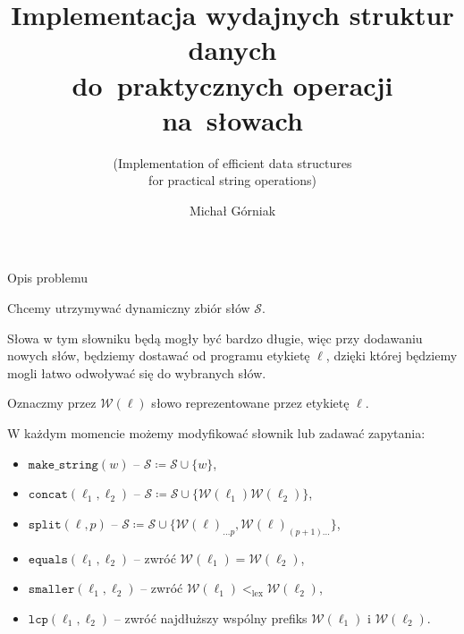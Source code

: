 \documentclass[polish]{beamer}
\title[Obrona pracy licencjackiej]{Implementacja wydajnych struktur danych\\ do~praktycznych operacji na~słowach}
\subtitle{(Implementation of efficient data structures\\ for practical string operations)}
\author{Michał Górniak}
\institute[II UWr]{Instytut Informatyki Uniwersytetu Wrocławskiego}
\date{\displaydate{date}}
\begin{document}
\begin{frame}
    \titlepage
\end{frame}

\begin{frame}{Opis problemu}
    \begin{alertblock}{}
        Chcemy utrzymywać dynamiczny zbiór słów $\mathcal{S}$.
    \end{alertblock}
    \pause
    \begin{block}{}
        Słowa w tym słowniku będą mogły być bardzo długie, więc przy dodawaniu nowych słów, będziemy dostawać od programu etykietę $\ell$, dzięki której będziemy mogli łatwo odwoływać się do wybranych słów. 
    \end{block}
    \pause
    \begin{block}{}
        Oznaczmy przez $\mathcal{W}(\ell)$ słowo reprezentowane przez etykietę $\ell$.
    \end{block}
    \pause
    W każdym momencie możemy modyfikować słownik lub zadawać zapytania:
    \begin{itemize}
        \item $\texttt{make\_string}(w)$ -- $\mathcal{S} \coloneqq \mathcal{S} \cup \{w\}$,
        \item $\texttt{concat}(\ell_1, \ell_2)$ -- $\mathcal{S} \coloneqq \mathcal{S} \cup \{\mathcal{W}(\ell_1)\mathcal{W}(\ell_2)\}$,
        \item $\texttt{split}(\ell, p)$ -- $\mathcal{S} \coloneqq \mathcal{S} \cup \{\mathcal{W}(\ell)_{\ldots p}, \mathcal{W}(\ell)_{(p + 1) \ldots}\}$, \pause
        \item $\texttt{equals}(\ell_1, \ell_2)$ -- zwróć $\mathcal{W}(\ell_1) = \mathcal{W}(\ell_2)$,
        \item $\texttt{smaller}(\ell_1, \ell_2)$ -- zwróć $\mathcal{W}(\ell_1) <_{\text{lex}} \mathcal{W}(\ell_2)$,
        \item $\texttt{lcp}(\ell_1, \ell_2)$ -- zwróć najdłuższy wspólny prefiks $\mathcal{W}(\ell_1)$ i $\mathcal{W}(\ell_2)$.
    \end{itemize}
\end{frame}

\newsavebox{\firstbox}
\end{document}
